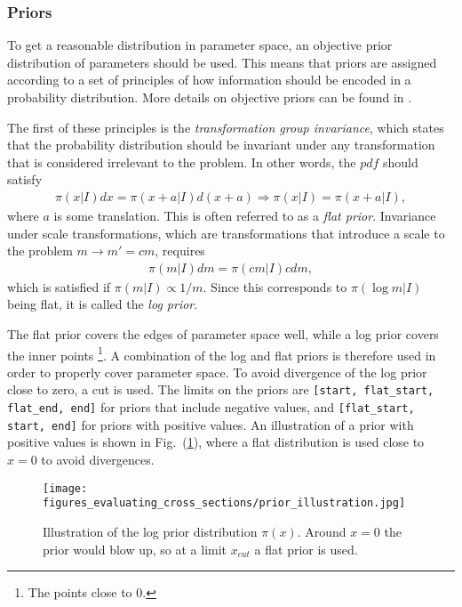 \documentclass[twoside,english]{uiofysmaster}
\begin{document}
\subsubsection{Priors}

To get a reasonable distribution in parameter space, an objective prior distribution of parameters should be used. This means that priors are assigned according to a set of principles of how information should be encoded in a probability distribution. More details on objective priors can be found in \cite{kvellestad2015chasing}.

The first of these principles is the \textit{transformation group invariance}, which states that the probability distribution should be invariant under any transformation that is considered irrelevant to the problem. In other words, the $pdf$ should satisfy
\begin{align}
\pi (x|I) dx = \pi (x+a|I)d(x+a) \Rightarrow \pi (x|I) = \pi (x+a|I) ,
\end{align}
where $a$ is some translation. This is often referred to as a \textit{flat prior}. Invariance under scale transformations, which are transformations that introduce a scale to the problem $m \rightarrow m' = cm$, requires
\begin{align}
\pi (m | I) dm = \pi (cm|I) c dm,
\end{align}
which is satisfied if $\pi (m |I) \propto 1/m$. Since this corresponds to $\pi (\log m | I)$ being flat, it is called the \textit{log prior}. 

The flat prior covers the edges of parameter space well, while a log prior covers the inner points \footnote{The points close to 0.}. A combination of the log and flat priors is therefore used in order to properly cover parameter space. To avoid divergence of the log prior close to zero, a cut is used. The limits on the priors are \verb|[start, flat_start, flat_end, end]| for priors that include negative values, and \verb|[flat_start, start, end]| for priors with positive values. An illustration of a prior with positive values is shown in Fig.\ (\ref{Fig:: evaluating cross : prior illustration}), where a flat distribution is used close to $x=0$ to avoid divergences.

\begin{figure}[H]
\centering
\texttt{[image: figures\_evaluating\_cross\_sections/prior\_illustration.jpg]}
\caption{Illustration of the log prior distribution $\pi(x)$. Around $x=0$ the prior would blow up, so at a limit $x_{cut}$ a flat prior is used.}
\label{Fig:: evaluating cross : prior illustration}
\end{figure}
\end{document}
